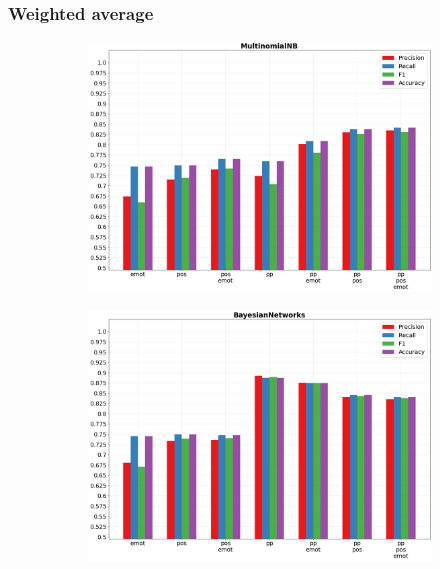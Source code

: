 \documentclass[oneside]{book}
\begin{document}
\subsubsection{Weighted average}
\vfill
\begin{figure}[!h]
	\hspace*{-3cm}
	\begin{subfigure}[b]{0.5\textwidth}
		\centering
		\includegraphics[width=10cm]{assets/reports/macro/nobow/MultinomialNB.png}
	\end{subfigure}
	\hfill
	\begin{subfigure}[b]{0.5\textwidth}
		\centering
		\hspace*{0.15cm}
		\includegraphics[width=10cm]{assets/reports/macro/nobow/BayesianNetworks.png}
	\end{subfigure}
\end{figure}
\vfill
\end{document}
